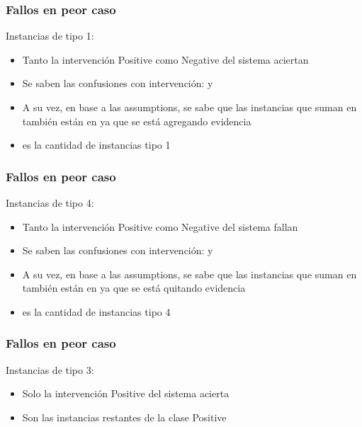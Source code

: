 \begin{frame}[t]
\frametitle{Fallos en peor caso}
\vspace{6mm}
Instancias de tipo 1: \\
\vspace{3mm}
\begin{itemize}
\item Tanto la intervenci\'on Positive como Negative del sistema aciertan
\item Se saben las confusiones con intervenci\'on: \IPTP y \INTP
\item A su vez, en base a las assumptions, se sabe que las instancias que suman en \INTP tambi\'en est\'an en \IPTP ya que se est\'a agregando evidencia
\item \INTP es la cantidad de instancias tipo 1
\end{itemize}
\end{frame}



\begin{frame}[t]
\frametitle{Fallos en peor caso}
\vspace{6mm}
Instancias de tipo 4: \\
\vspace{3mm}
\begin{itemize}
\item Tanto la intervenci\'on Positive como Negative del sistema fallan
\item Se saben las confusiones con intervenci\'on: \IPFN y \INFN
\item A su vez, en base a las assumptions, se sabe que las instancias que suman en \IPFN tambi\'en est\'an en \INFN ya que se est\'a quitando evidencia
\item \IPFN es la cantidad de instancias tipo 4
\end{itemize}
\end{frame}



\begin{frame}[t]
\frametitle{Fallos en peor caso}
\vspace{6mm}
Instancias de tipo 3: \\
\vspace{3mm}
\begin{itemize}
\item Solo la intervenci\'on Positive del sistema acierta
\item Son las instancias restantes de la clase Positive
\end{itemize}
\end{frame}



